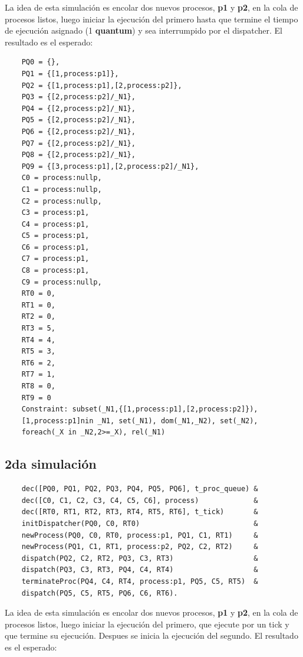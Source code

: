 \documentclass{article}
\begin{document}
La idea de esta simulación es encolar dos nuevos procesos, \textbf{p1} y \textbf{p2}, en la cola de procesos listos, luego iniciar la ejecución del primero hasta que termine el tiempo de ejecución asignado (1 \textbf{quantum}) y sea interrumpido por el dispatcher. El resultado es el esperado:

\begin{verbatim}
    PQ0 = {},  
    PQ1 = {[1,process:p1]},  
    PQ2 = {[1,process:p1],[2,process:p2]},  
    PQ3 = {[2,process:p2]/_N1},  
    PQ4 = {[2,process:p2]/_N1},  
    PQ5 = {[2,process:p2]/_N1},  
    PQ6 = {[2,process:p2]/_N1},  
    PQ7 = {[2,process:p2]/_N1},  
    PQ8 = {[2,process:p2]/_N1},  
    PQ9 = {[3,process:p1],[2,process:p2]/_N1},  
    C0 = process:nullp,  
    C1 = process:nullp,  
    C2 = process:nullp,  
    C3 = process:p1,  
    C4 = process:p1,  
    C5 = process:p1,  
    C6 = process:p1,  
    C7 = process:p1,  
    C8 = process:p1,  
    C9 = process:nullp,  
    RT0 = 0,  
    RT1 = 0,  
    RT2 = 0,  
    RT3 = 5,  
    RT4 = 4,  
    RT5 = 3,  
    RT6 = 2,  
    RT7 = 1,  
    RT8 = 0,  
    RT9 = 0
    Constraint: subset(_N1,{[1,process:p1],[2,process:p2]}), 
    [1,process:p1]nin _N1, set(_N1), dom(_N1,_N2), set(_N2), 
    foreach(_X in _N2,2>=_X), rel(_N1)
\end{verbatim}


\subsection*{2da simulación}

\begin{verbatim}
    dec([PQ0, PQ1, PQ2, PQ3, PQ4, PQ5, PQ6], t_proc_queue) &
    dec([C0, C1, C2, C3, C4, C5, C6], process)             &
    dec([RT0, RT1, RT2, RT3, RT4, RT5, RT6], t_tick)       &
    initDispatcher(PQ0, C0, RT0)                           & 
    newProcess(PQ0, C0, RT0, process:p1, PQ1, C1, RT1)     & 
    newProcess(PQ1, C1, RT1, process:p2, PQ2, C2, RT2)     & 
    dispatch(PQ2, C2, RT2, PQ3, C3, RT3)                   & 
    dispatch(PQ3, C3, RT3, PQ4, C4, RT4)                   & 
    terminateProc(PQ4, C4, RT4, process:p1, PQ5, C5, RT5)  & 
    dispatch(PQ5, C5, RT5, PQ6, C6, RT6). 
\end{verbatim}

La idea de esta simulación es encolar dos nuevos procesos, \textbf{p1} y \textbf{p2}, en la cola de procesos listos, luego iniciar la ejecución del primero, que ejecute por un tick y que termine su ejecución. Despues se inicia la ejecución del segundo. El resultado es el esperado:
\end{document}
